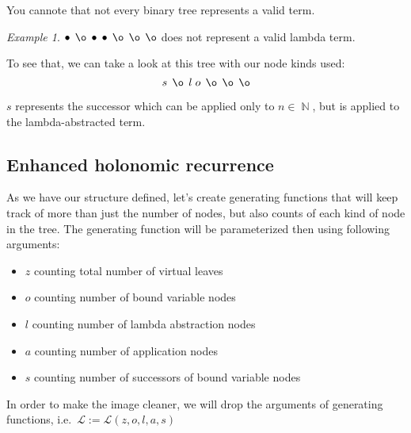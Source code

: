 \documentclass[final]{article}
\theoremstyle{definition}
\theoremstyle{definition}
\theoremstyle{remark}
\newtheorem{example}{Example}[subsection]
\newcommand{\gf}[1]{\ensuremath{\mathcal{#1}}}
\DeclareMathOperator{\N}{\mathbb{N}}
\DeclareMathOperator{\n}{\bullet}
\DeclareMathOperator{\no}{\o}
\begin{document}
You cannote that not every binary tree represents a valid term.

\begin{example}
    \(\n\; \no\; \n\; \n\; \no\; \no\; \no\) does not represent a valid lambda term.
\end{example}

To see that, we can take a look at this tree with our node kinds used:
    \[s\; \no\; l\; o\; \no\; \no\; \no\]

\(s\) represents the successor which can be applied only to \(n \in \N\), but is applied to the lambda-abstracted term.

\subsection{Enhanced holonomic recurrence}%
\label{sub:enhanced_holonomic_reccurence}

As we have our structure defined, let's create generating functions that will keep track of more than just the number of nodes, but also counts of each kind of node in the tree. The generating function will be parameterized then using following arguments:
\begin{itemize}
    \item \(z\) counting total number of virtual leaves
    \item \(o\) counting number of bound variable nodes
    \item \(l\) counting number of lambda abstraction nodes
    \item \(a\) counting number of application nodes
    \item \(s\) counting number of successors of bound variable nodes
\end{itemize}

In order to make the image cleaner, we will drop the arguments of generating functions, i.e.\ \(\gf{L} := \gf{L}(z, o, l, a, s)\)
\end{document}
